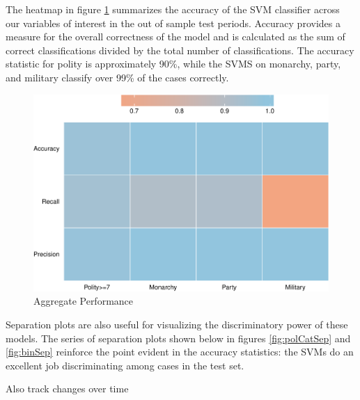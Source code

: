 \documentclass[pdftex,12pt,fullpage,oneside]{amsart}
\begin{document}
The heatmap in figure \ref{fig:aggPerf} summarizes the accuracy of the SVM classifier across our variables of interest in the out of sample test periods. Accuracy provides a measure for the overall correctness of the model and is calculated as the sum of correct classifications divided by the total number of classifications. The accuracy statistic for polity is approximately 90\%, while the SVMS on monarchy, party, and military classify over 99\% of the cases correctly. 


\begin{figure}[ht]
	\centering
	\includegraphics[width=.7\textwidth]{allAggPerf}	
	\caption{Aggregate Performance}
	\label{fig:aggPerf}
\end{figure}
\FloatBarrier

Separation plots are also useful for visualizing the discriminatory power of these models. The series of separation plots shown below in figures \ref{fig:polCatSep} and \ref{fig:binSep} reinforce the point evident in the accuracy statistics: the SVMs do an excellent job discriminating among cases in the test set.

\FloatBarrier

Also track changes over time


\end{document}

